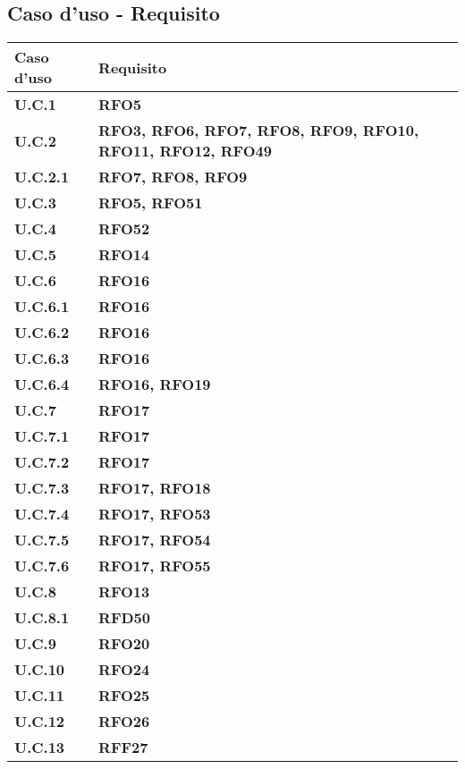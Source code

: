 \subsection{Caso d'uso - Requisito}
\begin{longtable}{|>{\centering\arraybackslash}m{}|>{\centering\arraybackslash}m{}|}
	\hline
	\textbf{Caso d'uso} & \textbf{Requisito}\\
	\endfirsthead
	\hline
	\textbf{U.C.1} & \textbf{RFO5} \\\hline
	\textbf{U.C.2} & \textbf{RFO3, RFO6, RFO7, RFO8, RFO9, RFO10, RFO11, RFO12, RFO49} \\\hline
	\textbf{U.C.2.1} & \textbf{RFO7, RFO8, RFO9} \\\hline
	\textbf{U.C.3} & \textbf{RFO5, RFO51} \\\hline
	\textbf{U.C.4} & \textbf{RFO52} \\\hline
	\textbf{U.C.5} & \textbf{RFO14} \\\hline
	\textbf{U.C.6} & \textbf{RFO16} \\\hline
	\textbf{U.C.6.1} & \textbf{RFO16} \\\hline
	\textbf{U.C.6.2} & \textbf{RFO16} \\\hline
	\textbf{U.C.6.3} & \textbf{RFO16} \\\hline
	\textbf{U.C.6.4} & \textbf{RFO16, RFO19} \\\hline
	\textbf{U.C.7} & \textbf{RFO17} \\\hline
	\textbf{U.C.7.1} & \textbf{RFO17} \\\hline
	\textbf{U.C.7.2} & \textbf{RFO17} \\\hline
	\textbf{U.C.7.3} & \textbf{RFO17, RFO18} \\\hline
	\textbf{U.C.7.4} & \textbf{RFO17, RFO53} \\\hline
	\textbf{U.C.7.5} & \textbf{RFO17, RFO54} \\\hline
	\textbf{U.C.7.6} & \textbf{RFO17, RFO55} \\\hline
	\textbf{U.C.8} & \textbf{RFO13} \\\hline
	\textbf{U.C.8.1} & \textbf{RFD50} \\\hline
	\textbf{U.C.9} & \textbf{RFO20} \\\hline
	\textbf{U.C.10} & \textbf{RFO24} \\\hline
	\textbf{U.C.11} & \textbf{RFO25} \\\hline
	\textbf{U.C.12} & \textbf{RFO26} \\\hline
	\textbf{U.C.13} & \textbf{RFF27} \\\hline

\end{longtable}
